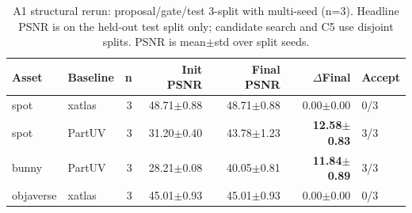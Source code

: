 \begin{table}[t]
\centering
\scriptsize
\caption{A1 structural rerun: proposal/gate/test 3-split with multi-seed (n=3). Headline PSNR is on the held-out test split only; candidate search and C5 use disjoint splits. PSNR is mean$\pm$std over split seeds.}
\label{tab:a1_split}
\begin{tabular}{@{}llrrrrl@{}}
\toprule
Asset & Baseline & n & Init PSNR & Final PSNR & $\Delta$Final & Accept \\
\midrule
spot & xatlas & 3 & 48.71$\pm$0.88 & 48.71$\pm$0.88 & 0.00$\pm$0.00 & 0/3 \\
spot & PartUV & 3 & 31.20$\pm$0.40 & 43.78$\pm$1.23 & \textbf{12.58$\pm$0.83} & 3/3 \\
bunny & PartUV & 3 & 28.21$\pm$0.08 & 40.05$\pm$0.81 & \textbf{11.84$\pm$0.89} & 3/3 \\
objaverse & xatlas & 3 & 45.01$\pm$0.93 & 45.01$\pm$0.93 & 0.00$\pm$0.00 & 0/3 \\
\bottomrule
\end{tabular}
\end{table}
